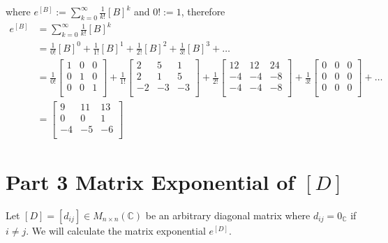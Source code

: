 \documentclass[12pt, letterpaper]{article}
\newcommand{\C}{\mathbb{C}}
\begin{document}
where $e^{[B]} := \sum_{k=0}^\infty \frac{1}{k!} [B]^k$ and $0! := 1$, therefore
\begin{align*}
	e^{[B]} &= \sum_{k=0}^\infty \frac{1}{k!} [B]^k \\
		   &=
		   \frac{1}{0!}[B]^0+\frac{1}{1!}[B]^1+\frac{1}{2!}[B]^2+\frac{1}{3!}[B]^3+\ldots \\
		   &=	
		   \frac{1}{0!}
		   \begin{bmatrix}
			1 & 0 & 0 \\
			0 & 1 & 0 \\
			0 & 0 & 1 \\
		   \end{bmatrix}
		   +\frac{1}{1!}
		   \begin{bmatrix}
			2 & 5 & 1 \\
			2 & 1 & 5 \\
			-2 & -3 & -3 \\
		   \end{bmatrix}		   
		   +\frac{1}{2!}
		   \begin{bmatrix}
			12 & 12 & 24 \\
			-4 & -4 & -8 \\
			-4 & -4 & -8 \\
		   \end{bmatrix}
		   +\frac{1}{3!}
		   \begin{bmatrix}
			0 & 0 & 0 \\
			0 & 0 & 0 \\
			0 & 0 & 0 \\
		   \end{bmatrix}		   
		   +\ldots \\
		   &=
		   \begin{bmatrix}
			9 & 11 & 13 \\
			0 & 0 & 1 \\
			-4 & -5 & -6 \\
		   \end{bmatrix}				   
\end{align*}

\section*{Part 3 \textmd{Matrix Exponential of $[D]$}}

Let $[D]=[d_{ij}] \in M_{n\times n}(\C)$ be an arbitrary diagonal matrix where $d_{ij} = 0_\C$ if $i \ne j$. We will calculate the matrix exponential $e^{[D]}$.
\end{document}
